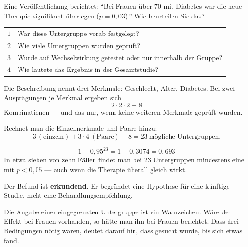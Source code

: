 \begin{aufgabe}
Eine Veröffentlichung berichtet: \enquote{Bei Frauen über $70$ mit Diabetes war die neue Therapie signifikant überlegen ($p = 0{,}03$).} Wie beurteilen Sie das?

\loesung
{}
\begin{center}
\renewcommand{\arraystretch}{1.5}
\begin{tabular}{@{}P{1.0cm}P{7.4cm}@{}}
\toprule
$1$ & War diese Untergruppe vorab festgelegt?\\
$2$ & Wie viele Untergruppen wurden geprüft?\\
$3$ & Wurde auf Wechselwirkung getestet oder nur innerhalb der Gruppe?\\
$4$ & Wie lautete das Ergebnis in der Gesamtstudie?\\
\bottomrule
\end{tabular}
\end{center}

Die Beschreibung nennt drei Merkmale: Geschlecht, Alter, Diabetes. Bei zwei Ausprägungen je Merkmal ergeben sich
\[ 2 \cdot 2 \cdot 2 = 8 \]
Kombinationen --- und das nur, wenn keine weiteren Merkmale geprüft wurden.

Rechnet man die Einzelmerkmale und Paare hinzu:
\[ 3 \ (\text{einzeln}) + 3 \cdot 4 \ (\text{Paare}) + 8 = 23 \ \text{mögliche Untergruppen} . \]

\[ 1 - 0{,}95^{23} = 1 - 0{,}3074 = 0{,}693 \]
In etwa sieben von zehn Fällen findet man bei $23$ Untergruppen mindestens eine mit $p < 0{,}05$ --- auch wenn die Therapie überall gleich wirkt.

\begin{center}
\begin{minipage}{0.9\textwidth}
Der Befund ist \textbf{erkundend}. Er begründet eine Hypothese für eine künftige Studie, nicht eine Behandlungsempfehlung.
\end{minipage}
\end{center}

Die Angabe einer  eingegrenzten Untergruppe ist ein Warnzeichen. Wäre der Effekt bei Frauen vorhanden, so hätte man ihn bei Frauen berichtet. Dass drei Bedingungen nötig waren, deutet darauf hin, dass gesucht wurde, bis sich etwas fand.


\end{aufgabe}

